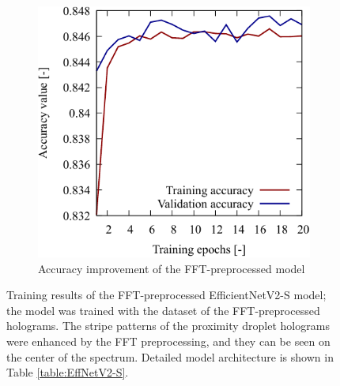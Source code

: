 \begin{figure}[H]
\begin{subfigure}[t]{0.45\linewidth}
        \includegraphics[width=\linewidth]{./Figure/4_Results/training/acc_fft.pdf}
        \caption{Accuracy improvement of the FFT-preprocessed model}
        \label{fig:fftmodel:acc}
    \end{subfigure}

    \caption{Training results of the FFT-preprocessed EfficientNetV2-S model; the model was trained with the dataset of the FFT-preprocessed holograms. The stripe patterns of the proximity droplet holograms were enhanced by the FFT preprocessing, and they can be seen on the center of the spectrum. Detailed model architecture is shown in Table \ref{table:EffNetV2-S}.} 
    \label{fig:fftmodel}
\end{figure}

